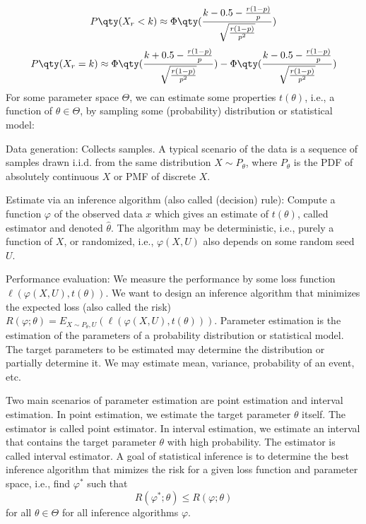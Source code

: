\documentclass[a4paper,12pt]{report}
\begin{document}
\[P\qty(X_r<k)\approx\Phi\qty(\frac{k-0.5-\frac{r(1-p)}{p}}{\sqrt{\frac{r(1-p)}{p^2}}})\]
\[P\qty(X_r=k)\approx\Phi\qty(\frac{k+0.5-\frac{r(1-p)}{p}}{\sqrt{\frac{r(1-p)}{p^2}}})-\Phi\qty(\frac{k-0.5-\frac{r(1-p)}{p}}{\sqrt{\frac{r(1-p)}{p^2}}})\]
For some parameter space $\Theta$, we can estimate some properties $t(\theta)$, i.e., a function of $\theta\in\Theta$, by sampling some (probability) distribution or statistical model:
\bit
\item Data generation: Collects samples. A typical scenario of the data is a sequence of samples drawn i.i.d. from the same distribution $X\sim P_{\theta}$, where $P_{\theta}$ is the PDF of absolutely continuous $X$ or PMF of discrete $X$.
\item Estimate via an inference algorithm (also called (decision) rule): Compute a function $\varphi$ of the observed data $x$ which gives an estimate of $t(\theta)$, called estimator and denoted $\hat{\theta}$. The algorithm may be deterministic, i.e., purely a function of $X$, or randomized, i.e., $\varphi(X,U)$ also depends on some random seed $U$.
\item Performance evaluation: We measure the performance by some loss function $\ell(\varphi(X,U),t(\theta))$. We want to design an inference algorithm that minimizes the expected loss (also called the risk) $R(\varphi;\theta)=E_{X\sim P_{\theta},U}(\ell(\varphi(X,U),t(\theta)))$.
\eit
{}
Parameter estimation is the estimation of the parameters of a probability distribution or statistical model. The target parameters to be estimated may determine the distribution or partially determine it. We may estimate mean, variance, probability of an event, etc.

Two main scenarios of parameter estimation are point estimation and interval estimation.
In point estimation, we estimate the target parameter $\theta$ itself. The estimator is called point estimator.
In interval estimation, we estimate an interval that contains the target parameter $\theta$ with high probability. The estimator is called interval estimator.
A goal of statistical inference is to determine the best inference algorithm that mimizes the risk for a given loss function and parameter space, i.e., find $\varphi^*$ such that
\[R(\varphi^*;\theta)\le R(\varphi;\theta)\]
for all $\theta\in\Theta$ for all inference algorithms $\varphi$.
\end{document}
